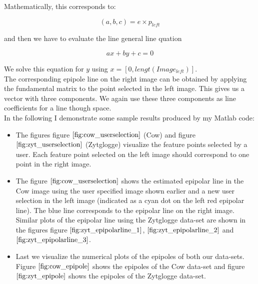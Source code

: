 \documentclass{paper}
\begin{document}
Mathematically, this corresponds to:

\begin{equation}
    (a,b,c) = e \times p_{left}
\end{equation}

and then we have to evaluate the line general line quation 

\begin{equation}
    ax + by + c = 0
\end{equation}

We solve this equation for $y$ using $x = [0,lengt(Image_{left})]$. \\

The corresponding epipole line on the right image can be obtained by applying the fundamental matrix to the point selected in the left image. This gives us a vector with three components. We again use these three components as line coefficients for a line though space. \\

In the following I demonstrate some sample results produced by my Matlab code:
\begin{itemize}
    \item The figures figure $\ref{fig:cow_userselection}$ (Cow) and figure $\ref{fig:zyt_userselection}$ (Zytglogge) visualize the feature points selected by a user. Each feature point selected on the left image should correspond to one point in the right image.
    \item The figure $\ref{fig:cow_userselection}$ shows the estimated epipolar line in the Cow image using the user specified image shown earlier and a new user selection in the left image (indicated as a cyan dot on the left red epipolar line). The blue line corresponds to the epipolar line on the right image. Similar plots of the epipolar line using the Zytglogge data-set are shown in the figures figure $\ref{fig:zyt_epipolarline_1}$, $\ref{fig:zyt_epipolarline_2}$ and $\ref{fig:zyt_epipolarline_3}$.
    \item Last we visualize the numerical plots of the epipoles of both our data-sets. Figure $\ref{fig:cow_epipole}$ shows the epipoles of the Cow data-set and figure $\ref{fig:zyt_epipole}$ shows the epipoles of the Zytglogge data-set.
\end{itemize}
\end{document}

